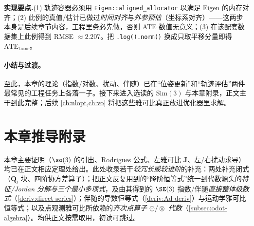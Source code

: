 \begin{note}
\textbf{实现要点.}\;(1) 轨迹容器必须用 \texttt{Eigen::aligned\_allocator} 以满足 Eigen 的内存对齐；(2) 此例的真值/估计已做过\emph{时间对齐}与\emph{外参预估}（坐标系对齐）——这两步本身是后续章节内容，工程里务必先做，否则 ATE 数值无意义；(3) 在该配套数据集上此例得到 RMSE $\approx 2.207$\cite{gaoxiang2019slam14}。把 \texttt{.log().norm()} 换成只取平移分量即得 $\mathrm{ATE}_{\text{trans}}$。
\end{note}

\paragraph{小结与过渡。}至此，本章的理论（指数/对数、扰动、伴随）已在“位姿更新”和“轨迹评估”两件最常见的工程任务上各落一子。接下来进入选读的 $\mathrm{Sim}(3)$ 与本章附录，正文主干到此完整；后续 \cref{ch:nlopt,ch:vo} 将把这些雅可比真正放进优化器里求解。

\section{本章推导附录}
\label{sec:lie-appendix}

本章主要证明（$\so(3)$ 的引出、Rodrigues 公式、左雅可比 $\mathbf{J}$、左/右扰动求导）均已在正文相应定理处给出。此处收录若干\emph{较冗长或较进阶}的补充：两处补充闭式（$\mathbf{Q}_l$ 块、四阶协方差算子）；把正文反复用到的“降阶恒等式”统一到代数源头的\emph{特征/Jordan 分解与三个最小多项式}，及由其得到的 $\SE(3)$ 指数/伴随\emph{直接整体级数式}（\cref{deriv:direct-series}）；伴随的导数恒等式（\cref{deriv:Ad-deriv}）与运动学雅可比恒等式；以及点观测雅可比所依赖的\emph{齐次点算子 $\odot/\circledcirc$ 代数}（\cref{subsec:odot-algebra}）。均供正文按需取用，初读可跳过。

